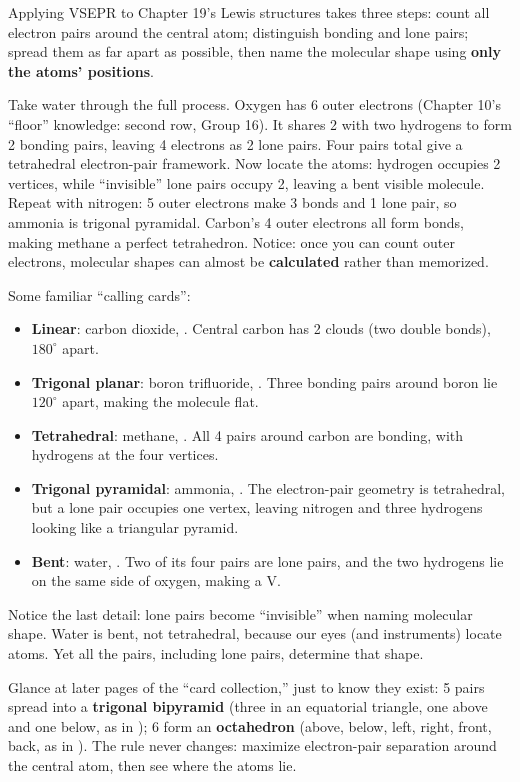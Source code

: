 Applying VSEPR to Chapter 19's Lewis structures takes three steps: count all electron pairs around the central atom; distinguish bonding and lone pairs; spread them as far apart as possible, then name the molecular shape using \textbf{only the atoms' positions}.

Take water through the full process. Oxygen has 6 outer electrons (Chapter 10's ``floor'' knowledge: second row, Group 16). It shares 2 with two hydrogens to form 2 bonding pairs, leaving 4 electrons as 2 lone pairs. Four pairs total give a tetrahedral electron-pair framework. Now locate the atoms: hydrogen occupies 2 vertices, while ``invisible'' lone pairs occupy 2, leaving a bent visible molecule. Repeat with nitrogen: 5 outer electrons make 3 bonds and 1 lone pair, so ammonia is trigonal pyramidal. Carbon's 4 outer electrons all form bonds, making methane a perfect tetrahedron. Notice: once you can count outer electrons, molecular shapes can almost be \textbf{calculated} rather than memorized.

Some familiar ``calling cards'':

\begin{itemize}[itemsep=2pt]
\item \textbf{Linear}: carbon dioxide, . Central carbon has 2 clouds (two double bonds), $180^{\circ}$ apart.
\item \textbf{Trigonal planar}: boron trifluoride, . Three bonding pairs around boron lie $120^{\circ}$ apart, making the molecule flat.
\item \textbf{Tetrahedral}: methane, . All 4 pairs around carbon are bonding, with hydrogens at the four vertices.
\item \textbf{Trigonal pyramidal}: ammonia, . The electron-pair geometry is tetrahedral, but a lone pair occupies one vertex, leaving nitrogen and three hydrogens looking like a triangular pyramid.
\item \textbf{Bent}: water, . Two of its four pairs are lone pairs, and the two hydrogens lie on the same side of oxygen, making a V.
\end{itemize}

Notice the last detail: lone pairs become ``invisible'' when naming molecular shape. Water is bent, not tetrahedral, because our eyes (and instruments) locate atoms. Yet all the pairs, including lone pairs, determine that shape.

Glance at later pages of the ``card collection,'' just to know they exist: 5 pairs spread into a \textbf{trigonal bipyramid} (three in an equatorial triangle, one above and one below, as in ); 6 form an \textbf{octahedron} (above, below, left, right, front, back, as in ). The rule never changes: maximize electron-pair separation around the central atom, then see where the atoms lie.

